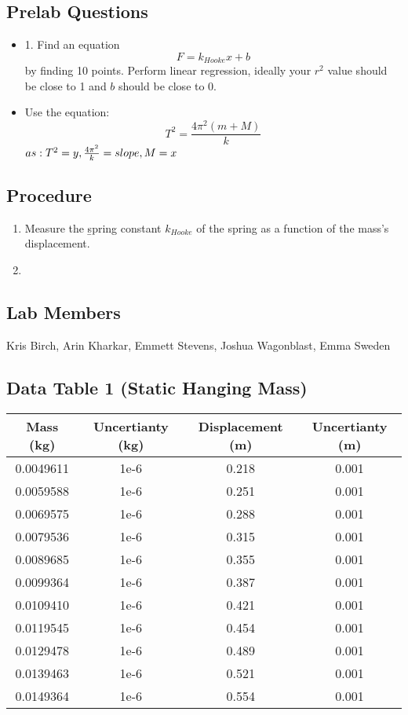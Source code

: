 \documentclass[12pt]{article}
\begin{document}
\subsection{Prelab Questions}
\begin{itemize}
\item 1. Find an equation \begin{equation}
    F = k_{Hooke} x + b
\end{equation} by finding 10 points. Perform linear regression, ideally your $r^2$ value should be close to 1 and $b$ should be close to 0.
\item Use the equation: \begin{equation}
    T^2 = \frac{4\pi^2(m+M)}{k}
\end{equation}
\noindent \(as: \space T^2 = y, \frac{4\pi^2}{k} = slope, \space M=x\)
\end{itemize}
\subsection{Procedure}
\begin{enumerate}
    \item Measure the \b{spring constant $k_{Hooke}$} of the spring as a function of the mass's displacement.
    \item 
\end{enumerate}
\subsection{Lab Members}
Kris Birch, Arin Kharkar, Emmett Stevens, Joshua Wagonblast, Emma Sweden

\subsection{Data Table 1 (Static Hanging Mass)}
\begin{tabular}{|c|c|c|c|}
    \hline
    Mass (kg) & Uncertianty (kg) & Displacement (m) & Uncertianty (m) \\
    \hline
    0.0049611 & 1e-6         & 0.218 & 0.001 \\
    0.0059588 & 1e-6         & 0.251 & 0.001 \\
    0.0069575 & 1e-6         & 0.288 & 0.001 \\
    0.0079536 & 1e-6         & 0.315 & 0.001 \\
    0.0089685 & 1e-6         & 0.355 & 0.001 \\  
    0.0099364 & 1e-6         & 0.387 & 0.001 \\
    0.0109410 & 1e-6         & 0.421 & 0.001 \\
    0.0119545 & 1e-6         & 0.454 & 0.001 \\
    0.0129478 & 1e-6         & 0.489 & 0.001 \\
    0.0139463 & 1e-6         & 0.521 & 0.001 \\
    0.0149364 & 1e-6         & 0.554 & 0.001 \\
    \hline
  \end{tabular}
\end{document}
